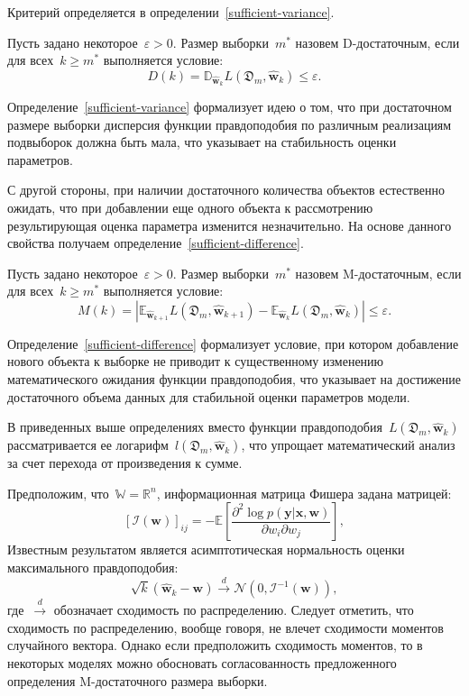 Критерий определяется в определении~\ref{sufficient-variance}.

\begin{definition}\label{sufficient-variance}
    Пусть задано некоторое~$\varepsilon > 0$.
    Размер выборки~$m^*$ назовем D-достаточным, если для всех~$k\geqslant m^*$ выполняется условие:
    \[
        D(k) = \mathbb{D}_{\hat{\mathbf{w}}_{k}} L(\mathfrak{D}_m, \hat{\mathbf{w}}_{k}) \leqslant \varepsilon.
    \]
\end{definition}

Определение~\ref{sufficient-variance} формализует идею о том, что при достаточном размере выборки дисперсия функции правдоподобия по различным реализациям подвыборок должна быть мала, что указывает на стабильность оценки параметров.

С другой стороны, при наличии достаточного количества объектов естественно ожидать, что при добавлении еще одного объекта к рассмотрению результирующая оценка параметра изменится незначительно. На основе данного свойства получаем определение~\ref{sufficient-difference}.

\begin{definition}\label{sufficient-difference}
    Пусть задано некоторое~$\varepsilon > 0$.
    Размер выборки~$m^*$ назовем M-достаточным, если для всех~$k\geqslant m^*$ выполняется условие:
    \[
        M(k) = \left| \mathbb{E}_{\hat{\mathbf{w}}_{k+1}} L(\mathfrak{D}_m, \hat{\mathbf{w}}_{k+1}) - \mathbb{E}_{\hat{\mathbf{w}}_{k}} L(\mathfrak{D}_m, \hat{\mathbf{w}}_{k}) \right| \leqslant \varepsilon.
    \]
\end{definition}

Определение~\ref{sufficient-difference} формализует условие, при котором добавление нового объекта к выборке не приводит к существенному изменению математического ожидания функции правдоподобия, что указывает на достижение достаточного объема данных для стабильной оценки параметров модели.

В приведенных выше определениях вместо функции правдоподобия~$L(\mathfrak{D}_m, \hat{\mathbf{w}}_{k})$ рассматривается ее логарифм~$l(\mathfrak{D}_m, \hat{\mathbf{w}}_{k})$, что упрощает математический анализ за счет перехода от произведения к сумме.

Предположим, что~$\mathbb{W} = \mathbb{R}^n$, информационная матрица Фишера задана матрицей:
\[
    \left[\mathcal{I}(\mathbf{w})\right]_{ij} = - \mathbb{E}\left[ \frac{\partial^2 \log p(\mathbf{y} | \mathbf{x}, \mathbf{w})}{\partial w_i \partial w_j} \right],
\]
Известным результатом является асимптотическая нормальность оценки максимального правдоподобия:
\[
    \sqrt{k}\left(\hat{\mathbf{w}}_k -\mathbf{w}\right)\xrightarrow{d}\mathcal{N}\left(0, \mathcal{I}^{-1}(\mathbf{w})\right),
\]
где~$\xrightarrow{d}$ обозначает сходимость по распределению. Следует отметить, что сходимость по распределению, вообще говоря, не влечет сходимости моментов случайного вектора.
Однако если предположить сходимость моментов, то в некоторых моделях можно обосновать согласованность предложенного определения M-достаточного размера выборки.

